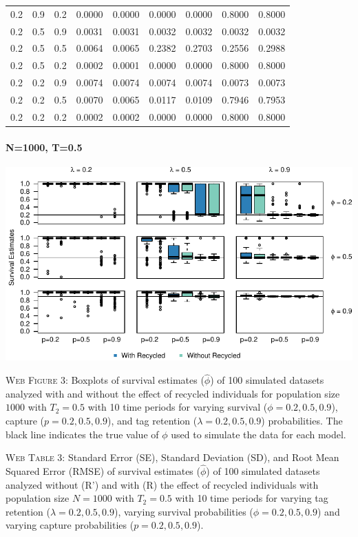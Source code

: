 \documentclass[]{article}
\let\oldparagraph\paragraph
\renewcommand{\paragraph}[1]{\oldparagraph{#1}\mbox{}}
\begin{document}
\begin{table}[ht]
{\begin{tabular}{rrrrrrrrr}
  0.2 & 0.9 & 0.2 & 0.0000 & 0.0000 & 0.0000 & 0.0000 & 0.8000 & 0.8000 \\ 
  0.2 & 0.5 & 0.9 & 0.0031 & 0.0031 & 0.0032 & 0.0032 & 0.0032 & 0.0032 \\ 
  0.2 & 0.5 & 0.5 & 0.0064 & 0.0065 & 0.2382 & 0.2703 & 0.2556 & 0.2988 \\ 
  0.2 & 0.5 & 0.2 & 0.0002 & 0.0001 & 0.0000 & 0.0000 & 0.8000 & 0.8000 \\ 
  0.2 & 0.2 & 0.9 & 0.0074 & 0.0074 & 0.0074 & 0.0074 & 0.0073 & 0.0073 \\ 
  0.2 & 0.2 & 0.5 & 0.0070 & 0.0065 & 0.0117 & 0.0109 & 0.7946 & 0.7953 \\ 
  0.2 & 0.2 & 0.2 & 0.0002 & 0.0002 & 0.0000 & 0.0000 & 0.8000 & 0.8000 \\ 
   \hline
\end{tabular}
}
\endgroup
\end{table}

\newpage

\paragraph{N=1000, T=0.5}\label{n1000-t0.5}

\includegraphics{Appendix_files/figure-latex/figure3_survival_GJSTL4-1.pdf}

\textsc{Web Figure 3:} Boxplots of survival estimates (\(\hat{\phi}\))
of 100 simulated datasets analyzed with and without the effect of
recycled individuals for population size \(1000\) with \(T_2=0.5\) with
10 time periods for varying survival (\(\phi=0.2,0.5,0.9\)), capture
(\(p=0.2,0.5,0.9\)), and tag retention (\(\lambda=0.2,0.5,0.9\))
probabilities. The black line indicates the true value of \(\phi\) used
to simulate the data for each model.

\textsc{Web Table 3:} Standard Error (SE), Standard Deviation (SD), and
Root Mean Squared Error (RMSE) of survival estimates (\(\hat{\phi}\)) of
100 simulated datasets analyzed without (R') and with (R) the effect of
recycled individuals with population size \(N=1000\) with \(T_2=0.5\)
with 10 time periods for varying tag retention
(\(\lambda=0.2,0.5,0.9\)), varying survival probabilities
(\(\phi=0.2,0.5,0.9\)) and varying capture probabilities
(\(p=0.2,0.5,0.9\)).
\end{document}
